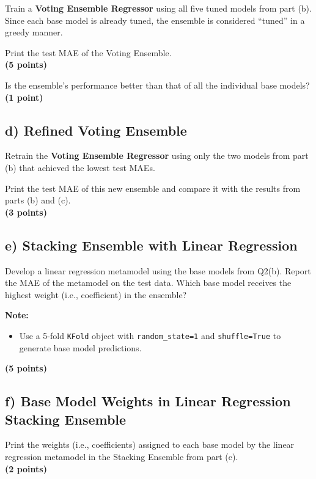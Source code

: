\documentclass[
  letterpaper,
  DIV=11,
  numbers=noendperiod]{scrreprt}
\providecommand{\tightlist}{%
  \setlength{\itemsep}{0pt}\setlength{\parskip}{0pt}}\usepackage{longtable,booktabs,array}
\begin{document}
Train a \textbf{Voting Ensemble Regressor} using all five tuned models
from part (b).\\
Since each base model is already tuned, the ensemble is considered
``tuned'' in a greedy manner.

Print the test MAE of the Voting Ensemble.\\
\textbf{(5 points)}

Is the ensemble's performance better than that of all the individual
base models?\\
\textbf{(1 point)}

\subsection{d) Refined Voting Ensemble}\label{d-refined-voting-ensemble}

Retrain the \textbf{Voting Ensemble Regressor} using only the two models
from part (b) that achieved the lowest test MAEs.

Print the test MAE of this new ensemble and compare it with the results
from parts (b) and (c).\\
\textbf{(3 points)}

\subsection{e) Stacking Ensemble with Linear
Regression}\label{e-stacking-ensemble-with-linear-regression}

Develop a linear regression metamodel using the base models from Q2(b).
Report the MAE of the metamodel on the test data. Which base model
receives the highest weight (i.e., coefficient) in the ensemble?

\textbf{Note:}

\begin{itemize}
\tightlist
\item
  Use a 5-fold \texttt{KFold} object with \texttt{random\_state=1} and
  \texttt{shuffle=True} to generate base model predictions.
\end{itemize}

\textbf{(5 points)}

\subsection{f) Base Model Weights in Linear Regression Stacking
Ensemble}\label{f-base-model-weights-in-linear-regression-stacking-ensemble}

Print the weights (i.e., coefficients) assigned to each base model by
the linear regression metamodel in the Stacking Ensemble from part
(e).\\
\textbf{(2 points)}
\end{document}
